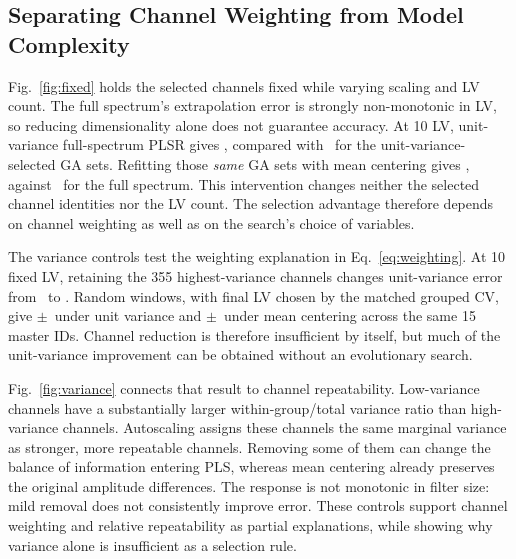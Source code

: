 \subsection{Separating Channel Weighting from Model Complexity}
Fig.~\ref{fig:fixed} holds the selected channels fixed while varying scaling and LV count. The full spectrum's extrapolation error is strongly non-monotonic in LV, so reducing dimensionality alone does not guarantee accuracy. At 10 LV, unit-variance full-spectrum PLSR gives \UnitFullFixedTen, compared with \UnitGAFixedTen\ for the unit-variance-selected GA sets. Refitting those \emph{same} GA sets with mean centering gives \MeanGAFixedTen, against \MeanFullFixedTen\ for the full spectrum. This intervention changes neither the selected channel identities nor the LV count. The selection advantage therefore depends on channel weighting as well as on the search's choice of variables.

The variance controls test the weighting explanation in Eq.~\ref{eq:weighting}. At 10 fixed LV, retaining the 355 highest-variance channels changes unit-variance error from \UnitFullFixedTen\ to \UnitVarianceHalfFixedTen. Random windows, with final LV chosen by the matched grouped CV, give \UnitRandom$\pm$\UnitRandomSD\ under unit variance and \MeanRandom$\pm$\MeanRandomSD\ under mean centering across the same 15 master IDs. Channel reduction is therefore insufficient by itself, but much of the unit-variance improvement can be obtained without an evolutionary search.

Fig.~\ref{fig:variance} connects that result to channel repeatability. Low-variance channels have a substantially larger within-group/total variance ratio than high-variance channels. Autoscaling assigns these channels the same marginal variance as stronger, more repeatable channels. Removing some of them can change the balance of information entering PLS, whereas mean centering already preserves the original amplitude differences. The response is not monotonic in filter size: mild removal does not consistently improve error. These controls support channel weighting and relative repeatability as partial explanations, while showing why variance alone is insufficient as a selection rule.

